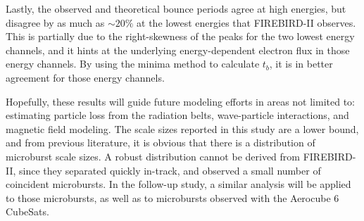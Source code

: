 \documentclass[draft,linenumbers]{agujournal}
\begin{document}
Lastly, the observed and theoretical bounce periods agree at high energies, but disagree by as much as $\sim 20 \%$ at the lowest energies that FIREBIRD-II observes. This is partially due to the right-skewness of the peaks for the two lowest energy channels, and it hints at the underlying energy-dependent electron flux in those energy channels. By using the minima method to calculate $t_b$, it is in better agreement for those energy channels. 

Hopefully, these results will guide future modeling efforts in areas not limited to: estimating particle loss from the radiation belts, wave-particle interactions, and magnetic field modeling. The scale sizes reported in this study are a lower bound, and from previous literature, it is obvious that there is a distribution of microburst scale sizes. A robust distribution cannot be derived from FIREBIRD-II, since they separated quickly in-track, and observed a small number of coincident microbursts. In the follow-up study, a similar analysis will be applied to those microbursts, as well as to microbursts observed with the Aerocube 6 CubeSats.







%
%
%
%
%
%
%
%
\end{document}
